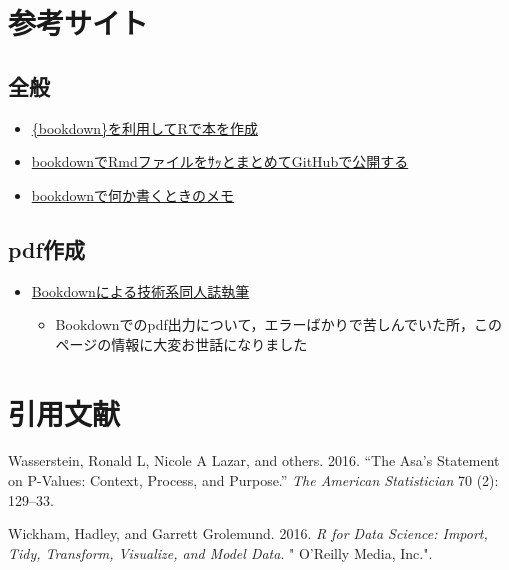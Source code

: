 \documentclass[xelatex,ja=standard]{bxjsbook}
\providecommand{\tightlist}{%
  \setlength{\itemsep}{0pt}\setlength{\parskip}{0pt}}
\begin{document}
\hypertarget{sanko}{%
\section{参考サイト}\label{sanko}}

\hypertarget{sanko_general}{%
\subsection{全般}\label{sanko_general}}

\begin{itemize}
\tightlist
\item
  \href{https://qiita.com/kazutan/items/40b45d4aaba88a4ed706}{\{bookdown\}を利用してRで本を作成}
\item
  \href{https://qiita.com/nozma/items/489497fe246ff8533bf9}{bookdownでRmdファイルをｻｯとまとめてGitHubで公開する}
\item
  \href{https://qiita.com/nozma/items/979fcb78275bf5b1628f}{bookdownで何か書くときのメモ}
\end{itemize}

\hypertarget{sanko_pdf}{%
\subsection{pdf作成}\label{sanko_pdf}}

\begin{itemize}
\tightlist
\item
  \href{https://teastat.blogspot.com/2019/01/bookdown.html}{Bookdownによる技術系同人誌執筆}

  \begin{itemize}
  \tightlist
  \item
    Bookdownでのpdf出力について，エラーばかりで苦しんでいた所，このページの情報に大変お世話になりました
  \end{itemize}
\end{itemize}

\hypertarget{reference}{%
\section*{引用文献}\label{reference}}

\hypertarget{refs}{}
\leavevmode\hypertarget{ref-wasserstein2016asa}{}%
Wasserstein, Ronald L, Nicole A Lazar, and others. 2016. ``The Asa's Statement on P-Values: Context, Process, and Purpose.'' \emph{The American Statistician} 70 (2): 129--33.

\leavevmode\hypertarget{ref-wickham2016r}{}%
Wickham, Hadley, and Garrett Grolemund. 2016. \emph{R for Data Science: Import, Tidy, Transform, Visualize, and Model Data}. " O'Reilly Media, Inc.".
\end{document}
